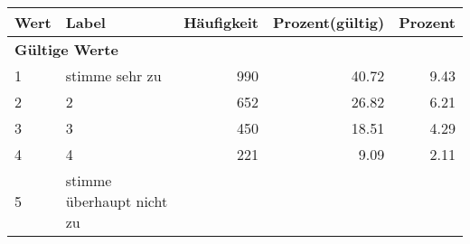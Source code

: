      \begin{longtable}{lXrrr}
     \toprule
     \textbf{Wert} & \textbf{Label} & \textbf{Häufigkeit} & \textbf{Prozent(gültig)} & \textbf{Prozent} \\
     \endhead
     \midrule
     \multicolumn{5}{l}{\textbf{Gültige Werte}}\\

     1 &
     \multicolumn{1}{X}{ stimme sehr zu   } &


       \num{990} &
       \num[round-mode=places,round-precision=2]{40.72} &
         \num[round-mode=places,round-precision=2]{9.43} \\

     2 &
     \multicolumn{1}{X}{ 2   } &


       \num{652} &
       \num[round-mode=places,round-precision=2]{26.82} &
         \num[round-mode=places,round-precision=2]{6.21} \\

     3 &
     \multicolumn{1}{X}{ 3   } &


       \num{450} &
       \num[round-mode=places,round-precision=2]{18.51} &
         \num[round-mode=places,round-precision=2]{4.29} \\

     4 &
     \multicolumn{1}{X}{ 4   } &


       \num{221} &
       \num[round-mode=places,round-precision=2]{9.09} &
         \num[round-mode=places,round-precision=2]{2.11} \\

     5 &
     \multicolumn{1}{X}{ stimme überhaupt nicht zu   } &



\end{longtable}
